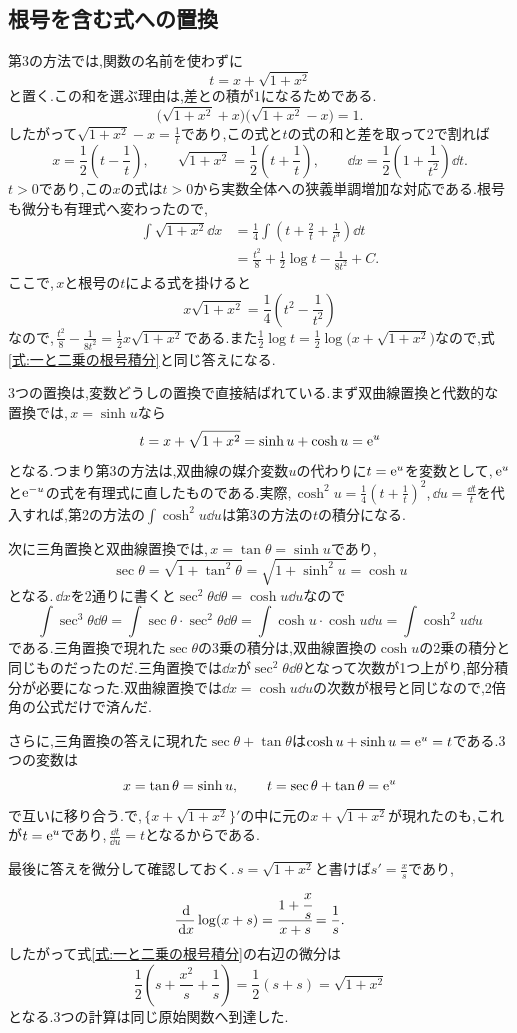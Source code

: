 \subsection{根号を含む式への置換}

第3の方法では,関数の名前を使わずに
\[
t=x+\sqrt{1+x^2}
\]
と置く.この和を選ぶ理由は,差との積が$1$になるためである.
\[
\bigl(\sqrt{1+x^2}+x\bigr)
\bigl(\sqrt{1+x^2}-x\bigr)=1.
\]
したがって$\sqrt{1+x^2}-x=\frac1t$であり,この式と$t$の式の和と差を取って2で割れば
\[
x=\frac12\left(t-\frac1t\right),\qquad
\sqrt{1+x^2}=\frac12\left(t+\frac1t\right),\qquad
\dd x=\frac12\left(1+\frac1{t^2}\right)\dd t.
\]
$t>0$であり,この$x$の式は$t>0$から実数全体への狭義単調増加な対応である.根号も微分も有理式へ変わったので,
\[
\begin{aligned}
\int\sqrt{1+x^2}\dd x
&=\frac14\int\left(t+\frac2t+\frac1{t^3}\right)\dd t\\
&=\frac{t^2}{8}+\frac12\log t-\frac1{8t^2}+C.
\end{aligned}
\]
ここで,\,$x$と根号の$t$による式を掛けると
\[
x\sqrt{1+x^2}=\frac14\left(t^2-\frac1{t^2}\right)
\]
なので,\,$\frac{t^2}{8}-\frac1{8t^2}=\frac12x\sqrt{1+x^2}$である.また$\frac12\log t=\frac12\log\bigl(x+\sqrt{1+x^2}\bigr)$なので,式\eqref{式:一と二乗の根号積分}と同じ答えになる.

3つの置換は,変数どうしの置換で直接結ばれている.まず双曲線置換と代数的な置換では,\,$x=\sinh u$なら
\[
t=x+\sqrt{1+x^2}=\sinh u+\cosh u=\mathrm{e}^u
\]
となる.つまり第3の方法は,双曲線の媒介変数$u$の代わりに$t=\mathrm{e}^u$を変数として,\,$\mathrm{e}^u$と$\mathrm{e}^{-u}$の式を有理式に直したものである.実際,\,$\cosh^2u=\frac14\left(t+\frac1t\right)^2$,\,$\dd u=\frac{\dd t}{t}$を代入すれば,第2の方法の$\int\cosh^2u\dd u$は第3の方法の$t$の積分になる.

次に三角置換と双曲線置換では,\,$x=\tan\theta=\sinh u$であり,
\[
\sec\theta=\sqrt{1+\tan^2\theta}=\sqrt{1+\sinh^2u}=\cosh u
\]
となる.\,$\dd x$を2通りに書くと$\sec^2\theta\dd\theta=\cosh u\dd u$なので
\[
\int\sec^3\theta\dd\theta
=\int\sec\theta\cdot\sec^2\theta\dd\theta
=\int\cosh u\cdot\cosh u\dd u
=\int\cosh^2u\dd u
\]
である.三角置換で現れた$\sec\theta$の3乗の積分は,双曲線置換の$\cosh u$の2乗の積分と同じものだったのだ.三角置換では$\dd x$が$\sec^2\theta\dd\theta$となって次数が1つ上がり,部分積分が必要になった.双曲線置換では$\dd x=\cosh u\dd u$の次数が根号と同じなので,2倍角の公式だけで済んだ.

さらに,三角置換の答えに現れた$\sec\theta+\tan\theta$は$\cosh u+\sinh u=\mathrm{e}^u=t$である.3つの変数は
\[
x=\tan\theta=\sinh u,\qquad
t=\sec\theta+\tan\theta=\mathrm{e}^u
\]
で互いに移り合う.で,\,$\{x+\sqrt{1+x^2}\}'$の中に元の$x+\sqrt{1+x^2}$が現れたのも,これが$t=\mathrm{e}^u$であり,\,$\frac{\dd t}{\dd u}=t$となるからである.

最後に答えを微分して確認しておく.\,$s=\sqrt{1+x^2}$と書けば$s'=\frac xs$であり,
\[
\frac{\,\mathrm{d}}{\,\mathrm{d} x}\log(x+s)
=\cfrac{1+\cfrac xs}{x+s}=\frac1s.
\]
したがって式\eqref{式:一と二乗の根号積分}の右辺の微分は
\[
\frac12\left(s+\frac{x^2}{s}+\frac1s\right)
=\frac12(s+s)=\sqrt{1+x^2}
\]
となる.3つの計算は同じ原始関数へ到達した.



